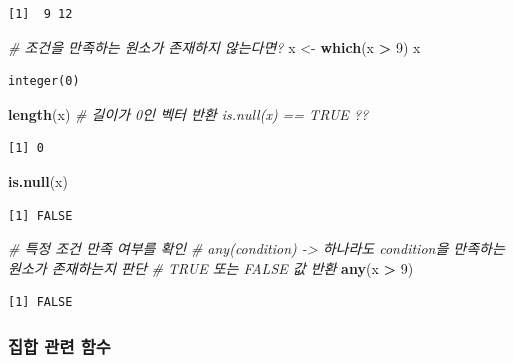 \documentclass[
  11pt,
]{krantz}
\newenvironment{Shaded}{\begin{snugshade}}{\end{snugshade}}
\newcommand{\CommentTok}[1]{\textcolor[rgb]{0.37,0.37,0.37}{\textit{#1}}}
\newcommand{\DecValTok}[1]{\textcolor[rgb]{0.06,0.06,0.06}{#1}}
\newcommand{\KeywordTok}[1]{\textcolor[rgb]{0.27,0.27,0.27}{\textbf{#1}}}
\newcommand{\NormalTok}[1]{#1}
\newcommand{\OperatorTok}[1]{\textcolor[rgb]{0.43,0.43,0.43}{\textbf{#1}}}
\newcommand{\StringTok}[1]{\textcolor[rgb]{0.5,0.5,0.5}{#1}}
\begin{document}
\begin{verbatim}
[1]  9 12
\end{verbatim}

\begin{Shaded}
\begin{Highlighting}[]
\CommentTok{# 조건을 만족하는 원소가 존재하지 않는다면?}
\NormalTok{x <-}\StringTok{ }\KeywordTok{which}\NormalTok{(x }\OperatorTok{>}\StringTok{ }\DecValTok{9}\NormalTok{)}
\NormalTok{x}
\end{Highlighting}
\end{Shaded}

\begin{verbatim}
integer(0)
\end{verbatim}

\begin{Shaded}
\begin{Highlighting}[]
\KeywordTok{length}\NormalTok{(x) }\CommentTok{# 길이가 0인 벡터 반환 is.null(x) == TRUE ??}
\end{Highlighting}
\end{Shaded}

\begin{verbatim}
[1] 0
\end{verbatim}

\begin{Shaded}
\begin{Highlighting}[]
\KeywordTok{is.null}\NormalTok{(x)}
\end{Highlighting}
\end{Shaded}

\begin{verbatim}
[1] FALSE
\end{verbatim}

\begin{Shaded}
\begin{Highlighting}[]
\CommentTok{# 특정 조건 만족 여부를 확인 }
\CommentTok{# any(condition) -> 하나라도 condition을 만족하는 원소가 존재하는지 판단}
\CommentTok{# TRUE 또는 FALSE 값 반환}
\KeywordTok{any}\NormalTok{(x }\OperatorTok{>}\StringTok{ }\DecValTok{9}\NormalTok{)}
\end{Highlighting}
\end{Shaded}

\begin{verbatim}
[1] FALSE
\end{verbatim}

\normalsize

\hypertarget{set-function}{%
\subsubsection*{\texorpdfstring{\textbf{집합 관련 함수}}{집합 관련 함수}}\label{set-function}}
\end{document}
